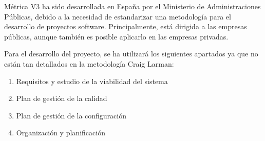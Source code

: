 \pagebreak
\par Métrica V3 ha sido desarrollada en España por el Ministerio de Administraciones Públicas, debido a la necesidad de estandarizar una metodología para el desarrollo de proyectos software. Principalmente, está dirigida a las empresas públicas, aunque también es posible aplicarlo en las empresas privadas.
\par Para el desarrollo del proyecto, se ha utilizará los siguientes apartados ya que no están tan detallados en la metodología Craig Larman:
\begin{enumerate}[1.]
\item Requisitos y estudio de la viabilidad del sistema
\item Plan de gestión de la calidad
\item Plan de gestión de la configuración
\item Organización y planificación
\end{enumerate}
